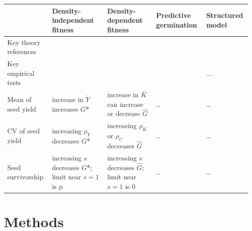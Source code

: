 \documentclass[12pt, oneside, titlepage]{article}   	%
\begin{document}
\begin{landscape}

 \label{tab:title} 

\begin{tabular}{ |p{2.5cm}|p{4cm}|p{4cm}|p{4cm}|p{4cm}|  }
 \hline
  & Density-independent fitness & Density-dependent fitness & Predictive \newline germination & Structured model \\
 \hline
 Key theory \newline references   & \cite{cohen1966,cohen1968}    & \cite{ellner1985,ellner1985a} &   \cite{cohen1967} & \cite{easterling2000} \\
 \hline
 Key empirical \newline tests & \cite{venable2007}  & \cite{gremer2014}   & \cite{gremer2016} & ... \\
 \hline
 Mean of \newline seed yield    & increase in $\bar{Y}$ increases $G$* & increase in $\bar{K}$ can increase or decrease $\hat{G}$  &  \dots & \dots \\
 \hline
 CV of \newline seed yield & increasing $\rho_Y$ decreases $G$* & increasing $\rho_K$ or $\rho_C$ decreases $\hat{G}$ &  \dots  & \dots \\
 \hline
 Seed \newline survivorship & increasing $s$ decreases $G$*; limit near $s=1$ is p & increasing $s$ decreases $\hat{G}$; limit near $s=1$ is 0  & \dots  & \dots \\
 \hline

 \hline
\end{tabular}

\end{landscape}

\newpage


\section*{Methods}
\end{document}

